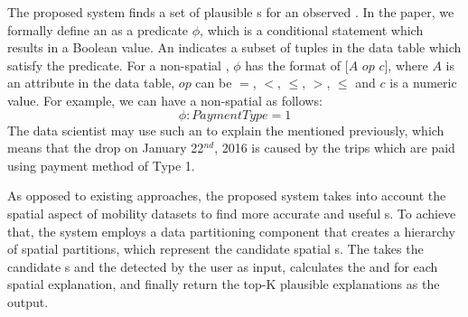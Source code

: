 The proposed system finds a set of plausible {\explanation}s for an observed {\fact}. In the paper, we formally define an {\explanation} as a predicate $\phi$, which is a conditional statement which results in a Boolean value. An {\explanation} indicates a subset of tuples in the data table which satisfy the predicate. For a non-spatial {\explanation}, $\phi$ has the format of $[A$ $op$ $c]$, where $A$ is an attribute in the data table, $op$ can be $=$, $<$, $\leq$, $>$, $\leq$ and $c$ is a numeric value. For example, we can have a non-spatial {\explanation} as follows:
$$\phi: PaymentType = 1$$
The data scientist may use such an {\explanation} to explain the {\fact} mentioned previously, which means that the drop on January 22$^{nd}$, 2016 is caused by the trips which are paid using payment method of Type 1.


As opposed to existing approaches, the proposed system takes into account the spatial aspect of mobility datasets to find more accurate and useful {\explanation}s.
To achieve that, the system employs a data partitioning component that creates a hierarchy of spatial partitions, which represent the candidate spatial {\explanation}s. %
The {\evaluator} takes the candidate {\explanation}s and the {\fact} detected by the user as input, calculates the {\intensity} and {\influence} for each spatial explanation, and finally return the top-K plausible explanations as the output.




